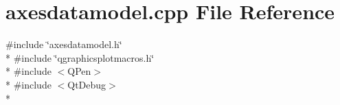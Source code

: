 \section{axesdatamodel.\+cpp File Reference}
\label{axesdatamodel_8cpp}
{\ttfamily \#include \char`\"{}axesdatamodel.\+h\char`\"{}}\\*
{\ttfamily \#include \char`\"{}qgraphicsplotmacros.\+h\char`\"{}}\\*
{\ttfamily \#include $<$Q\+Pen$>$}\\*
{\ttfamily \#include $<$Qt\+Debug$>$}\\*
